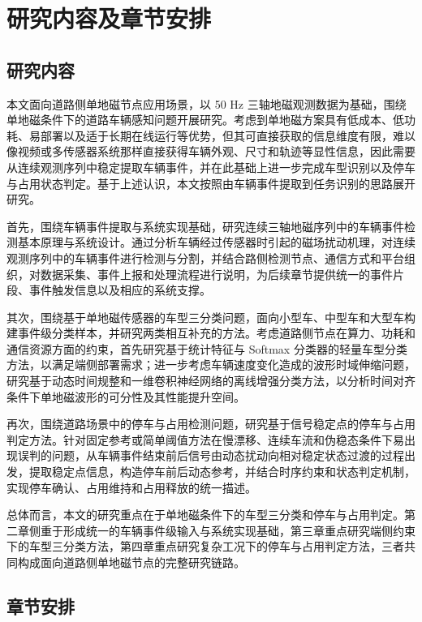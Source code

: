 \section{研究内容及章节安排}
\label{sec:intro_content}

\subsection{研究内容}
\label{sec:research_content}

本文面向道路侧单地磁节点应用场景，以 50 Hz 三轴地磁观测数据为基础，围绕单地磁条件下的道路车辆感知问题开展研究。考虑到单地磁方案具有低成本、低功耗、易部署以及适于长期在线运行等优势，但其可直接获取的信息维度有限，难以像视频或多传感器系统那样直接获得车辆外观、尺寸和轨迹等显性信息，因此需要从连续观测序列中稳定提取车辆事件，并在此基础上进一步完成车型识别以及停车与占用状态判定。基于上述认识，本文按照由车辆事件提取到任务识别的思路展开研究。

首先，围绕车辆事件提取与系统实现基础，研究连续三轴地磁序列中的车辆事件检测基本原理与系统设计。通过分析车辆经过传感器时引起的磁场扰动机理，对连续观测序列中的车辆事件进行检测与分割，并结合路侧检测节点、通信方式和平台组织，对数据采集、事件上报和处理流程进行说明，为后续章节提供统一的事件片段、事件触发信息以及相应的系统支撑。

其次，围绕基于单地磁传感器的车型三分类问题，面向小型车、中型车和大型车构建事件级分类样本，并研究两类相互补充的方法。考虑道路侧节点在算力、功耗和通信资源方面的约束，首先研究基于统计特征与 Softmax 分类器的轻量车型分类方法，以满足端侧部署需求；进一步考虑车辆速度变化造成的波形时域伸缩问题，研究基于动态时间规整和一维卷积神经网络的离线增强分类方法，以分析时间对齐条件下单地磁波形的可分性及其性能提升空间。

再次，围绕道路场景中的停车与占用检测问题，研究基于信号稳定点的停车与占用判定方法。针对固定参考或简单阈值方法在慢漂移、连续车流和伪稳态条件下易出现误判的问题，从车辆事件结束前后信号由动态扰动向相对稳定状态过渡的过程出发，提取稳定点信息，构造停车前后动态参考，并结合时序约束和状态判定机制，实现停车确认、占用维持和占用释放的统一描述。

总体而言，本文的研究重点在于单地磁条件下的车型三分类和停车与占用判定。第二章侧重于形成统一的车辆事件级输入与系统实现基础，第三章重点研究端侧约束下的车型三分类方法，第四章重点研究复杂工况下的停车与占用判定方法，三者共同构成面向道路侧单地磁节点的完整研究链路。

\subsection{章节安排}
\label{sec:thesis_organization}

